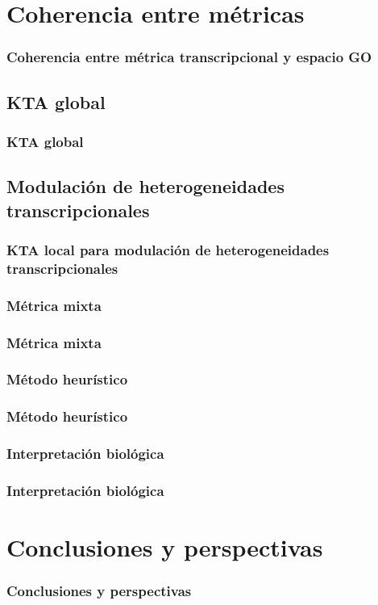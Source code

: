 \documentclass[serif,9pt, t]{beamer}
\begin{document}
\section{Coherencia entre métricas}
\begin{frame}
\frametitle{Coherencia entre métrica transcripcional y espacio GO} 
\end{frame}

\subsection{KTA global}
\begin{frame}
\frametitle{KTA global} 
\end{frame}

\subsection{Modulación de heterogeneidades
transcripcionales}
\begin{frame}
\frametitle{KTA local para modulación de heterogeneidades transcripcionales} 
\end{frame}
\subsubsection*{Métrica mixta}
\begin{frame}
\frametitle{Métrica mixta} 
\end{frame}
\subsubsection*{Método heurístico}
\begin{frame}
\frametitle{Método heurístico} 
\end{frame}
\subsubsection*{Interpretación biológica}
\begin{frame}
\frametitle{Interpretación biológica} 
\end{frame}
\section{Conclusiones y perspectivas}
\begin{frame}
\frametitle{Conclusiones y perspectivas} 
\end{frame}
\end{document}
